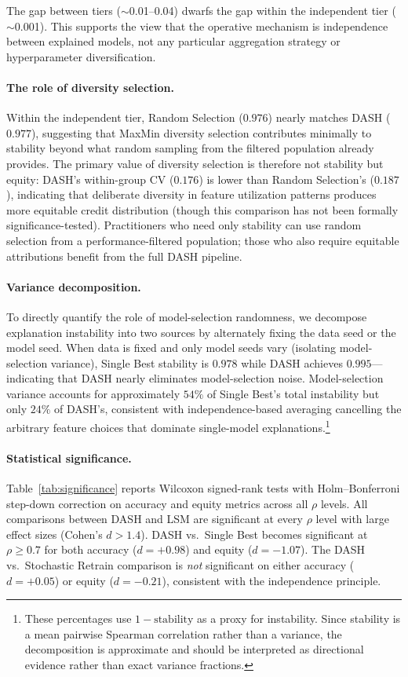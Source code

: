 \documentclass[11pt]{article}
\newcommand{\dash}{\textsc{DASH}}
\newcommand{\rhovar}{\rho}
\begin{document}
The gap between tiers ($\sim$0.01--0.04) dwarfs the gap within the
independent tier ($\sim$0.001). This supports the view that the operative
mechanism is independence between explained models, not any particular
aggregation strategy or hyperparameter diversification.

\paragraph{The role of diversity selection.}
Within the independent tier, Random Selection ($0.976$) nearly matches
\dash{} ($0.977$), suggesting that MaxMin diversity selection contributes
minimally to stability beyond what random sampling from the filtered
population already provides. The primary value of diversity selection
is therefore not stability but equity: \dash{}'s within-group CV
($0.176$) is lower than Random Selection's ($0.187$), indicating that
deliberate diversity in feature utilization patterns produces more
equitable credit distribution (though this comparison has not been
formally significance-tested). Practitioners who need only stability
can use random selection from a performance-filtered population;
those who also require equitable attributions benefit from the full
\dash{} pipeline.

\paragraph{Variance decomposition.}
To directly quantify the role of model-selection randomness, we
decompose explanation instability into two sources by alternately fixing
the data seed or the model seed. When data is fixed and only model seeds
vary (isolating model-selection variance), Single Best stability is
$0.978$ while \dash{} achieves $0.995$---indicating that \dash{}
nearly eliminates model-selection noise. Model-selection variance
accounts for approximately $54\%$ of Single Best's total instability but only $24\%$
of \dash{}'s, consistent with independence-based averaging cancelling the
arbitrary feature choices that dominate single-model
explanations.\footnote{These percentages use $1 - \text{stability}$ as
a proxy for instability. Since stability is a mean pairwise Spearman
correlation rather than a variance, the decomposition is approximate
and should be interpreted as directional evidence rather than exact
variance fractions.}

\paragraph{Statistical significance.}
Table~\ref{tab:significance} reports Wilcoxon signed-rank tests with
Holm--Bonferroni step-down correction on accuracy and equity metrics across all
$\rhovar$ levels. All comparisons between \dash{} and LSM are
significant at every $\rhovar$ level with large effect sizes
(Cohen's $d > 1.4$). \dash{} vs.\ Single Best becomes significant at
$\rhovar \geq 0.7$ for both accuracy ($d = +0.98$) and equity
($d = -1.07$). The \dash{} vs.\ Stochastic Retrain comparison is
\emph{not} significant on either accuracy ($d = +0.05$) or equity
($d = -0.21$), consistent with the independence principle.
\end{document}
